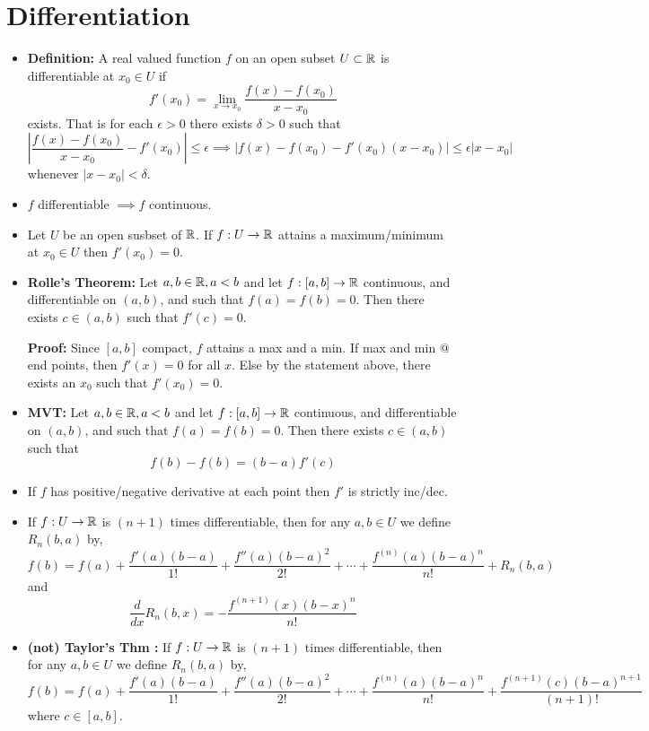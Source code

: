 \documentclass[12pt]{article}
\begin{document}


\section{Differentiation}

\begin{itemize}
    \item \textbf{Definition:} A real valued function $f$ on an open subset $U \subset \mathbb R$ is differentiable at $x_0 \in U$ if 
    \[f'(x_0) = \underset{x \to x_0}{\lim}\frac{f(x) - f(x_0)}{x - x_0}\]
    exists. That is for each $\epsilon > 0$ there exists $\delta >0$ such that 
    \[\left |\frac{f(x) - f(x_0)}{x-x_0} - f'(x_0) \right | \leq \epsilon \implies |f(x) - f(x_0) - f'(x_0) (x-x_0)| \leq \epsilon|x-x_0|\]
    whenever $|x - x_0| < \delta$. 
    \item $f$ differentiable $\implies f$ continuous. 
    \item Let $U$ be an open susbset of $\mathbb R$. If $f: U \to \mathbb R$ attains a maximum/minimum at $x_0 \in U$ then $f'(x_0) = 0.$  
    \item \textbf{Rolle's Theorem:} Let $a, b \in \mathbb R, a < b$ and let $f: [a,b] \to \mathbb R$ continuous, and differentiable on $(a,b)$, and such that $f(a) = f(b) = 0$. Then there exists $c \in (a,b)$ such that $f'(c) = 0$.
    
    \textbf{Proof:} Since $[a,b]$ compact, $f$ attains a max and a min. If max and min @ end points, then $f'(x) = 0$ for all $x$. Else by the statement above, there exists an $x_0$ such that $f'(x_0) = 0$. 
    \item \textbf{MVT:} Let $a, b \in \mathbb R, a < b$ and let $f: [a,b] \to \mathbb R$ continuous, and differentiable on $(a,b)$, and such that $f(a) = f(b) = 0$. Then there exists $c \in (a,b)$ such that 
    \[f(b) - f(b) = (b-a)f'(c)\]
    \item If $f$ has positive/negative derivative at each point then $f'$ is strictly inc/dec. 
    \item If $f: U \to \mathbb R$ is $(n+1)$ times differentiable, then for any $a, b \in U$ we define $R_n(b, a)$ by, 
    \[f(b) = f(a) + \frac{f'(a)(b-a)}{1!} + \frac{f''(a)(b-a)^2}{2!} + \cdots + \frac{f^{(n)}(a)(b-a)^n}{n!} + R_n(b,a)\]
    and \[\frac{d}{dx}R_n(b,x) = - \frac{f^{(n+1)}(x)(b-x)^n} {n!}\]
    \item \textbf{(not) Taylor's Thm :} If $f: U \to \mathbb R$ is $(n+1)$ times differentiable, then for any $a, b \in U$ we define $R_n(b, a)$ by, 
    \[f(b) = f(a) + \frac{f'(a)(b-a)}{1!} + \frac{f''(a)(b-a)^2}{2!} + \cdots + \frac{f^{(n)}(a)(b-a)^n}{n!} + \frac{f^{(n+1)}(c)(b-a)^{n+1}}{(n+1)!}\]
    where $c \in [a, b]$.
\end{itemize}
\end{document}
